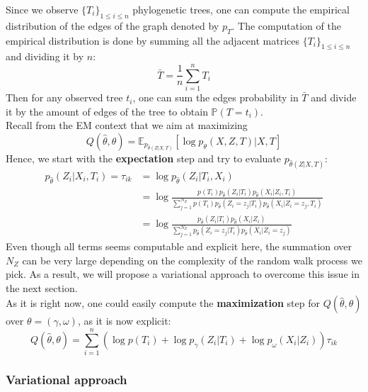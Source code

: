 Since we observe $\{T_i\}_{1 \leq i \leq n}$ phylogenetic trees, one can compute the empirical distribution of the edges of the graph denoted by $p_{T}$.
The computation of the empirical distribution is done by summing all the adjacent matrices $\{T_i\}_{1 \leq i \leq n}$ and dividing it by $n$:
$$
\bar{T} = \frac{1}{n} \sum_{i=1}^n T_i
$$
Then for any observed tree $t_i$, one can sum the edges probability in $\bar{T}$ and divide it by the amount of edges of the tree to obtain $\mathbb{P}(T = t_i)$. \\

Recall from the EM context that we aim at maximizing
$$
Q(\widehat{\theta}, \theta) = \mathbb{E}_{p_{\widehat{\theta}(Z|X,T)}}[\log p_{\theta}(X, Z, T) | X,T]
$$
Hence, we start with the \textbf{expectation} step and try to evaluate $p_{\widehat{\theta}(Z|X,T)}$:
$$
\begin{align}
    p_{\widehat{\theta}}(Z_i|X_i,T_i) = \tau_{ik} &= \log p_{\widehat{\theta}}(Z_i | T_i, X_i) \\
                                &= \log \frac{p(T_i) p_{\widehat{\theta}}(Z_i | T_i) p_{\widehat{\theta}}(X_i | Z_i, T_i)}{\sum_{j=1}^{N_Z} p(T_i) p_{\widehat{\theta}}(Z_i=z_j | T_i) p_{\widehat{\theta}}(X_i | Z_i=z_j, T_i)} \\
                                &= \log \frac{p_{\widehat{\theta}}(Z_i | T_i) p_{\widehat{\theta}}(X_i | Z_i)}{\sum_{j=1}^{N_Z} p_{\widehat{\theta}}(Z_i=z_j | T_i) p_{\widehat{\theta}}(X_i | Z_i=z_j)}
\end{align}
$$
Even though all terms seems computable and explicit here, the summation over $N_Z$ can be very large depending on the complexity of the random walk process we pick.
As a result, we will propose a variational approach to overcome this issue in the next section. \\

As it is right now, one could easily compute the \textbf{maximization} step for $Q(\widehat{\theta}, \theta)$ over $\theta = (\gamma, \omega)$, as it is now explicit:
$$
Q(\widehat{\theta}, \theta) = \sum_{i=1}^n (\log p(T_i) + \log p_{\gamma}(Z_i | T_i) + \log p_{\omega}(X_i | Z_i)) \tau_{ik}
$$

\subsubsection{Variational approach}

